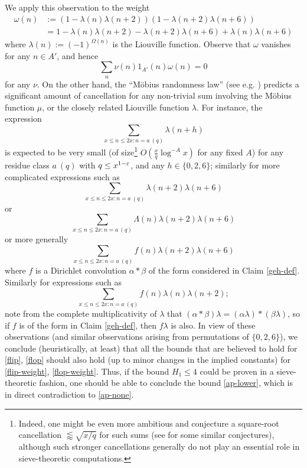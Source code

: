 We apply this observation to the weight
\begin{align*}
\omega(n) &:= (1 - \lambda(n) \lambda(n+2)) (1 - \lambda(n+2) \lambda(n+6)) \\
&=  1 - \lambda(n)\lambda(n+2) - \lambda(n+2)\lambda(n+6) + \lambda(n) \lambda(n+6)
\end{align*}
where $\lambda(n) := (-1)^{\Omega(n)}$ is the Liouville function.  Observe that $\omega$ vanishes for any $n\in A'$, and hence
\begin{equation}\label{ap-none}
\sum_n \nu(n) 1_{A'}(n) \omega(n) = 0
\end{equation}
for any $\nu$.  On the other hand, the ``M\"obius randomness law'' (see e.g. \cite{ik}) predicts a significant amount of cancellation for any non-trivial sum involving the M\"obius function $\mu$, or the closely related Liouville function $\lambda$.  For instance, the expression
$$ \sum_{x \leq n \leq 2x: n = a\ (q)} \lambda(n+h)$$
is expected to be very small (of size\footnote{Indeed, one might be even more ambitious and conjecture a square-root cancellation $\lessapprox \sqrt{x/q}$ for such sums (see \cite{mont} for some similar conjectures), although such stronger cancellations generally do not play an essential role in sieve-theoretic computations.} $O( \frac{x}{q} \log^{-A} x)$ for any fixed $A$) for any residue class $a\ (q)$ with $q \leq x^{1-\varepsilon}$, and any $h \in \{0,2,6\}$; similarly for more complicated expressions such as
$$ \sum_{x \leq n \leq 2x: n = a\ (q)} \lambda(n+2) \lambda(n+6)$$
or
$$ \sum_{x \leq n \leq 2x: n = a\ (q)} \Lambda(n) \lambda(n+2) \lambda(n+6)$$
or more generally
$$ \sum_{x \leq n \leq 2x: n = a\ (q)} f(n) \lambda(n+2) \lambda(n+6)$$
where $f$ is a Dirichlet convolution $\alpha \ast \beta$ of the form considered in Claim \ref{geh-def}.  Similarly for expressions such as
$$ \sum_{x \leq n \leq 2x: n = a\ (q)} f(n) \lambda(n) \lambda(n+2);$$
note from the complete multiplicativity of $\lambda$ that $(\alpha \ast \beta) \lambda = (\alpha \lambda) \ast (\beta \lambda)$, so if $f$ is of the form in Claim \ref{geh-def}, then $f\lambda$ is also.  In view of these observations (and similar observations arising from permutations of $\{0,2,6\}$), we conclude (heuristically, at least) that all the bounds that are believed to hold for \eqref{flip}, \eqref{flop} should also hold (up to minor changes in the implied constants) for \eqref{flip-weight}, \eqref{flop-weight}.  Thus, if the bound $H_1 \leq 4$ could be proven in a sieve-theoretic fashion, one should be able to conclude the bound \eqref{ap-lower}, which is in direct contradiction to \eqref{ap-none}.

